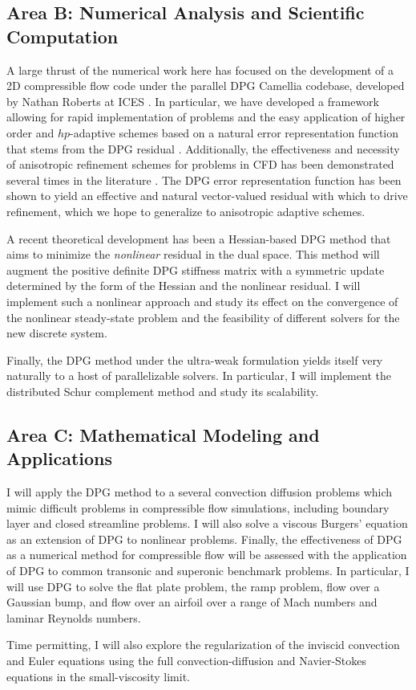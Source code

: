 \documentclass[12pt,letterpaper,oneside]{article}
\begin{document}
\subsection*{Area B: Numerical Analysis and Scientific Computation}

A large thrust of the numerical work here has focused on the development of a 2D compressible flow code under the parallel DPG Camellia codebase, developed by Nathan Roberts at ICES \cite{Camellia}.  In particular, we have developed a framework allowing for rapid implementation of problems and the easy application of higher order and $hp$-adaptive schemes based on a natural error representation function that stems from the DPG residual \cite{DPG2, DPG3}. Additionally, the effectiveness and necessity of anisotropic refinement schemes for problems in CFD has been demonstrated several times in the literature \cite{anisotropy1,anisotropy2}. The DPG error representation function has been shown to yield an effective and natural vector-valued residual with which to drive refinement, which we hope to generalize to anisotropic adaptive schemes. 

A recent theoretical development has been a Hessian-based DPG method that aims to minimize the \emph{nonlinear} residual in the dual space.  This method will augment the positive definite DPG stiffness matrix with a symmetric update determined by the form of the Hessian and the nonlinear residual.  I will implement such a nonlinear approach and study its effect on the convergence of the nonlinear steady-state problem and the feasibility of different solvers for the new discrete system.  

Finally, the DPG method under the ultra-weak formulation yields itself very naturally to a host of parallelizable solvers.  In particular, I will implement the distributed Schur complement method and study its scalability.  

\subsection*{Area C: Mathematical Modeling and Applications}

I will apply the DPG method to a several convection diffusion problems which mimic difficult problems in compressible flow simulations, including boundary layer and closed streamline problems.  I will also solve a viscous Burgers' equation as an extension of DPG to nonlinear problems.  Finally, the effectiveness of DPG as a numerical method for compressible flow will be assessed with the application of DPG to common transonic and superonic benchmark problems.  In particular, I will use DPG to solve the flat plate problem, the ramp problem, flow over a Gaussian bump, and flow over an airfoil over a range of Mach numbers and laminar Reynolds numbers.  

Time permitting, I will also explore the regularization of the inviscid convection and Euler equations using the full convection-diffusion and Navier-Stokes equations in the small-viscosity limit.  




\end{document}
